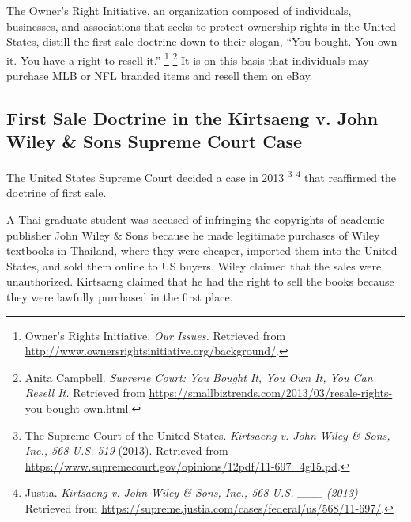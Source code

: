 \documentclass[letterpaper,11pt]{texMemo}
\begin{document}
  The Owner's Right Initiative, an organization composed of individuals, businesses, and associations that seeks to protect ownership rights in the United States, distill the first sale doctrine down to their slogan, ``You bought. You own it. You have a right to resell it.''
     \footnote{Owner's Rights Initiative. \emph{Our Issues.} Retrieved from \href{http://www.ownersrightsinitiative.org/background/}{http://www.ownersrightsinitiative.org/background/}.
      }
    \footnote{Anita Campbell. \emph{Supreme Court: You Bought It, You Own It, You Can Resell It.} Retrieved from \href{https://smallbiztrends.com/2013/03/resale-rights-you-bought-own.html}{https://smallbiztrends.com/2013/03/resale-rights-you-bought-own.html}.
      }
  It is on this basis that individuals may purchase MLB or NFL branded items and resell them on eBay.

  \subsection*{First Sale Doctrine in the Kirtsaeng v. John Wiley \& Sons Supreme Court Case}
    The United States Supreme Court decided a case in 2013
    \footnote{The Supreme Court of the United States. \emph{Kirtsaeng v. John Wiley \& Sons, Inc., 568 U.S. 519} (2013). Retrieved from \href{https://www.supremecourt.gov/opinions/12pdf/11-697_4g15.pd}{https://www.supremecourt.gov/opinions/12pdf/11-697_4g15.pd}.
    }
    \footnote{Justia. \emph{Kirtsaeng v. John Wiley \& Sons, Inc., 568 U.S. \_\_\_ (2013)} Retrieved from \href{https://supreme.justia.com/cases/federal/us/568/11-697/}{https://supreme.justia.com/cases/federal/us/568/11-697/}.
    }
    that reaffirmed the doctrine of first sale.

    A Thai graduate student was accused of infringing the copyrights of academic publisher John Wiley \& Sons because he made legitimate purchases of Wiley textbooks in Thailand, where they were cheaper, imported them into the United States, and sold them online to US buyers. Wiley claimed that the sales were unauthorized. Kirtsaeng claimed that he had the right to sell the books because they were lawfully purchased in the first place.
\end{document}
